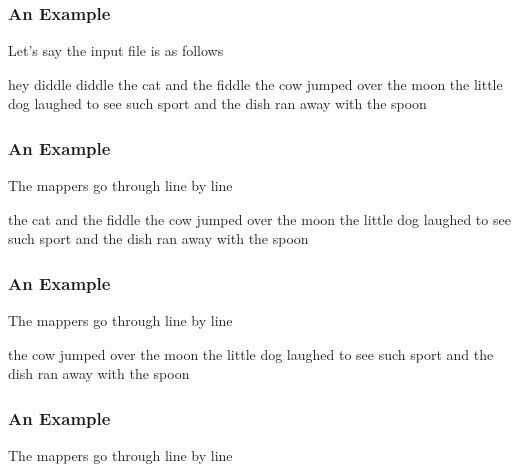 \documentclass{beamer}
\newcommand{\beb}{\begin{exampleblock}}
\newcommand{\eeb}{\end{exampleblock}}
\begin{document}
\begin{frame}[fragile]
\frametitle{An Example}

\beb{Let's say the input file is as follows}
{\scriptsize
\begin{code}
hey diddle diddle
the cat and the fiddle
the cow jumped over the 
 moon
the little dog laughed
to see such sport
and the dish ran away 
 with the spoon
\end{code}
}
\eeb
\end{frame}


\begin{frame}[fragile]
\frametitle{An Example}

\beb{The mappers go through line by line}
{\scriptsize
\begin{code}
the cat and the fiddle
the cow jumped over the 
 moon
the little dog laughed
to see such sport
and the dish ran away 
 with the spoon
\end{code}
}
\eeb
\end{frame}

\begin{frame}[fragile]
\frametitle{An Example}

\beb{The mappers go through line by line}
{\scriptsize
\begin{code}
the cow jumped over the 
 moon
the little dog laughed
to see such sport
and the dish ran away with 
 the spoon
\end{code}
}
\eeb
\end{frame}
\begin{frame}[fragile]
\frametitle{An Example}

\beb{The mappers go through line by line}
{\scriptsize
\begin{code}
\end{code}
}
\eeb
\end{frame}
\end{document}
